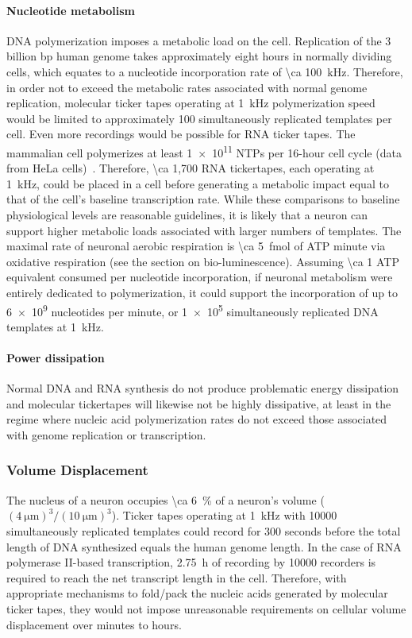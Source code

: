 \paragraph{Nucleotide metabolism}
DNA polymerization imposes a metabolic load on the cell.
Replication of the 3 billion bp human genome takes approximately eight hours in normally dividing cells, which equates to a nucleotide incorporation rate of \SI{\ca 100}{\kHz}.
Therefore, in order not to exceed the metabolic rates associated with normal genome replication, molecular ticker tapes operating at \SI{1}{\kHz} polymerization speed~\cite{kelman95} would be limited to approximately 100 simultaneously replicated templates per cell.
Even more recordings would be possible for RNA ticker tapes.
The mammalian cell polymerizes at least \num{1e11} NTPs per 16-hour cell cycle (data from HeLa cells)~\cite{jackson00}.
Therefore, \num{\ca 1,700} RNA tickertapes, each operating at \SI{1}{\kHz}, could be placed in a cell before generating a metabolic impact equal to that of the cell's baseline transcription rate.
While these comparisons to baseline physiological levels are reasonable guidelines, it is likely that a neuron can support higher metabolic loads associated with larger numbers of templates.
The maximal rate of neuronal aerobic respiration is \SI{\ca 5}{\femto\mole} of ATP minute via oxidative respiration (see the section on bio-luminescence). Assuming \num{\ca 1} ATP equivalent consumed per nucleotide incorporation, if neuronal metabolism were entirely dedicated to polymerization, it could support the incorporation of up to \num{6e9} nucleotides per minute, or \num{1e5} simultaneously replicated DNA templates at \SI{1}{\kHz}. %

\paragraph{Power dissipation}
Normal DNA and RNA synthesis do not produce problematic energy dissipation and molecular tickertapes will likewise not be highly dissipative, at least in the regime where nucleic acid polymerization rates do not exceed those associated with genome replication or transcription.

\subsubsection{Volume Displacement}

The nucleus of a neuron occupies \SI{\ca 6}{\percent} of a neuron's volume ($(\SI{4}{\um})^3/(\SI{10}{\um})^3$).
Ticker tapes operating at \SI{1}{\kHz} with \num{10000} simultaneously replicated templates could record for \num{300} seconds before the total length of DNA synthesized equals the human genome length.
In the case of RNA polymerase II-based transcription, \SI{2.75}{\hour} of recording by \num{10000} recorders is required to reach the net transcript length in the cell.
Therefore, with appropriate mechanisms to fold/pack the nucleic acids generated by molecular ticker tapes, they would not impose unreasonable requirements on cellular volume displacement over minutes to hours.

